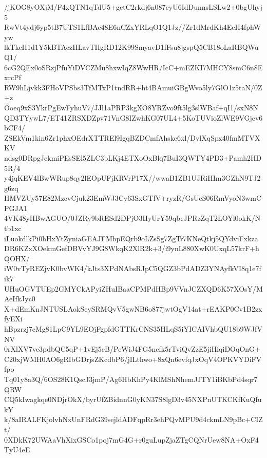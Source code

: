 /jKOG8yOXjM/F4xQTN1qTdU5+gctC2rkdj6n087cyU6IdDunnsLSLw2+0bgUhyj5
RwVt4ydj6yp5tB7UTS1LfBAe48E6nCZxYRLqO1Q1Jz//Zr1dMrdKh4EeH4fphWyw
lkTkeH1d1Y5kBTAczHLavTHgRD12K99SmyavD1fFsu8jgspQ5CB18oLaRBQWuQ1/
6cG2QEx0oSRzjPfuYiDVCZMu8hxwIqZ8WwHR/IcC+mEZKI7MHCY8smC6n8ExrcPf
RW9hLjvkk3FHoVPSbs3TfMTxP1tndRR+ht4BAmuiGBgWvo5ly7GlO1z5taN/0Z+z
Ooeq9xS3YkrPgEwFyhuV7/JJl1aPRP3kgXO8YRZvo9ft5lg3slWBaf+qI1/sxN8N
QD3TYywL7/ET41ZRSXDZpv71VnG8IZwhKG07UL4+5KoTUVioZlWE9VGjev6bCF4/
ZSEkVm1kin6Zr1phxOEdrXTTREl9IgqBZDCmfAhske6xl/DvlXqSpx40fmMTVXKV
ndsg0DRpgJekmiPEsSEl5ZLC3bLKj4ETXoOxBlq7BuI3QWTY4PD3+Pamh2HD5R/4
y4jqKEV4lBwWRup8qy2lEOpUFjKRVrP17X//wwaB1ZB1UJRiHIm3GZhN9TJ2g6zq
HMVZUy57E82MzcvCjuk23EmWJ3Cy63SxGTfV+ryzR/GsUeS06RmVyoN3wmCPGJA1
4VK48yHBwAGUO/0JZRy9bRESd2DPjO3HyUrY59qbeJPRzZqT2LOYl0okK/Ntb1xc
iLuokdlkPi0hHxYtZyniaGEAJFMbpEQrb9oLZsSg7ZgTr7KNeQtkj5QYdviFxkza
DR6KZxXOekmGefDBVvYJ9G8WkqK2XlR2k+3/i9ynL880XwK0UxqL57krF+hQOHX/
iW0vTyREZjvK0bvWK4/kJts3XPdNAbsRJpC5QGZ3bPdADZ3YNAyfkVI8q1e7fik7
UHuOGVTUEp2GMYCkAPyiZHuIBaaCPMPdHBp9VVnJCZXQD6K57XOsY/MAeIfkJyc0
X+dEmKnJNTUSLAokSeySRMQvV5gwNB6o877jwtOgV14at+rEAKP0Cv1B2zxfyEXi
hBpzrzj7cMg81LpC9YL9EOjFgpfdGTTKrCNS35HLqS5iYICAIVhbQU18b9WJfVNV
0rXlXV7ve3pdbQC5qP+1vEj5eB/PeWiJ4FG5ncfk5rTviQvZzE5jiHiqiDOqOnG+
C20xjWMH0AO6gRIbGDrjsZKcdbP6/jILthwo+8xQn6evfqJxOqV4OPKVYDiFVfpo
Tq01y8a3Q/6OS28K1QscJ3jmP/Ag6HbKhPy4KlMShNhemJJTY1iBKbPd4sqr7QRW
CQ5kIwagkqe0NDjrOkX/byrUfZBidnnG0yKN37S8lgD3v45NXPnUTKCKfKuQfukY
k/8aIRALFKjolvhNxUnFRdG39sejldADFqpRr3ehPQvMPU9d4ckmLN9pBc+CIZt/
0XDkK72UWAaVhXixGSCo1poj7mG4G+r0guLupZjaZTgCQNrUew8NA+OxF4TyU4eE
